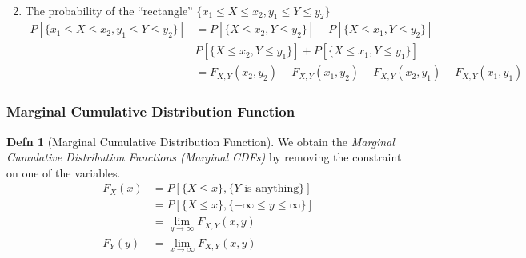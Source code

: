 \documentclass[10pt,letterpaper,final,twoside,notitlepage]{article}
\theoremstyle{plain}
\theoremstyle{definition}
\newtheorem{definition}{Defn}
\begin{document}
\begin{enumerate}[label=\textbf{(\roman*)}, noitemsep, nolistsep]
\begin{equation}
\begin{aligned}
					\end{aligned}
				\end{equation}
			\item The probability of the ``rectangle'' $\lbrace x_{1} \leq X \leq x_{2}, y_{1} \leq Y \leq y_{2} \rbrace$
				\begin{equation} \label{eq:Joint CDF Property 5}
					\begin{aligned}
						P \left[ \lbrace x_{1} \leq X \leq x_{2}, y_{1} \leq Y \leq y_{2} \rbrace \right] &= P \left[ \lbrace X \leq x_{2}, Y \leq y_{2} \rbrace \right] - P \left[ \lbrace X \leq x_{1}, Y \leq y_{2} \rbrace \right] - \\
						&P \left[ \lbrace X \leq x_{2}, Y \leq y_{1} \rbrace \right] + P \left[ \lbrace X \leq x_{1}, Y \leq y_{1} \rbrace \right] \\
						&= F_{X,Y} \left( x_{2}, y_{2} \right) - F_{X,Y} \left( x_{1}, y_{2} \right) - F_{X,Y} \left( x_{2}, y_{1} \right) + F_{X,Y} \left( x_{1}, y_{1} \right)
					\end{aligned}
				\end{equation}
		\end{enumerate}
	
		\subsubsection[Marginal CDF]{Marginal Cumulative Distribution Function} \label{subsubsec:Marginal CDF}
			\begin{definition}[Marginal Cumulative Distribution Function] \label{def:Marginal CDF}
				We obtain the \emph{Marginal Cumulative Distribution Functions (Marginal CDFs)} by removing the constraint on one of the variables. 
				\begin{equation} \label{eq:Marginal CDF}
					\begin{aligned}
						F_{X} \left( x \right) &= P \left[ \lbrace X \leq x \rbrace, \lbrace Y \text{ is anything} \rbrace \right] \\
						&= P \left[ \lbrace X \leq x \rbrace, \lbrace -\infty \leq y \leq \infty \rbrace \right] \\
						&= \lim\limits_{y \rightarrow \infty} F_{X,Y} \left( x,y \right) \\
						F_{Y} \left( y \right) &= \lim\limits_{x \rightarrow \infty} F_{X,Y} \left( x,y \right) \\
					\end{aligned}
				\end{equation}
			\end{definition}
\end{document}
